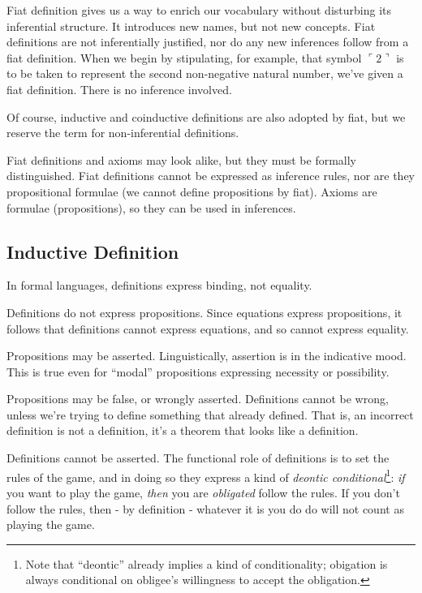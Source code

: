 Fiat definition gives us a way to enrich our vocabulary without
disturbing its inferential structure. It introduces new names, but not
new concepts. Fiat definitions are not inferentially justified, nor do
any new inferences follow from a fiat definition. When we begin by
stipulating, for example, that symbol \(\ulcorner 2\urcorner\) is to
be taken to represent the second non-negative natural number, we've
given a fiat definition. There is no inference involved.

Of course, inductive and coinductive definitions are also adopted by
fiat, but we reserve the term for non-inferential definitions.

Fiat definitions and axioms may look alike, but they must be formally
distinguished. Fiat definitions cannot be expressed as inference
rules, nor are they propositional formulae (we cannot define
propositions by fiat). Axioms are formulae (propositions), so they can
be used in inferences.

\subsection{Inductive Definition}

In formal languages, definitions express binding, not equality.

Definitions do not express propositions. Since equations express
propositions, it follows that definitions cannot express equations,
and so cannot express equality.

Propositions may be asserted. Linguistically, assertion is in the
indicative mood. This is true even for ``modal'' propositions
expressing necessity or possibility.

Propositions may be false, or wrongly asserted. Definitions cannot be
wrong, unless we're trying to define something that already defined.
That is, an incorrect definition is not a definition, it's a theorem
that looks like a definition.

Definitions cannot be asserted. The functional role of definitions is
to set the rules of the game, and in doing so they express a kind of
\textit{deontic conditional}\footnote{Note that ``deontic'' already
implies a kind of conditionality; obigation is always conditional on
obligee's willingness to accept the obligation.}: \textit{if} you want
to play the game, \textit{then} you are \textit{obligated} follow the
rules. If you don't follow the rules, then - by definition - whatever
it is you do do will not count as playing the game.

